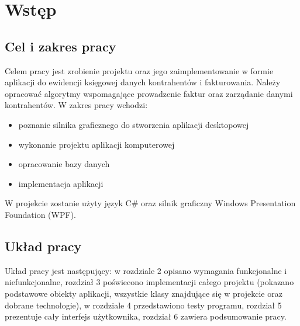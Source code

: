 \chapter{Wstęp}
\section{Cel i zakres pracy}
Celem pracy jest zrobienie projektu oraz jego zaimplementowanie w formie aplikacji do ewidencji księgowej danych kontrahentów i fakturowania. Należy opracować algorytmy wspomagające prowadzenie faktur oraz zarządanie danymi kontrahentów. W zakres pracy wchodzi:
\begin{itemize}
    \item poznanie silnika graficznego do stworzenia aplikacji desktopowej
    \item wykonanie projektu aplikacji komputerowej
    \item opracowanie bazy danych
    \item implementacja aplikacji
\end{itemize}
W projekcie zostanie użyty język C\# oraz silnik graficzny Windows Presentation Foundation (WPF).

\section{Układ pracy}
Układ pracy jest następujący: w rozdziale 2 opisano wymagania funkcjonalne i niefunkcjonalne, rozdział 3 poświecono implementacji całego projektu (pokazano podstawowe obiekty aplikacji, wszystkie klasy znajdujące się w projekcie oraz dobrane technologie), w rozdziale 4 przedstawiono testy programu, rozdział 5 prezentuje cały interfejs użytkownika, rozdział 6 zawiera podsumowanie pracy.

